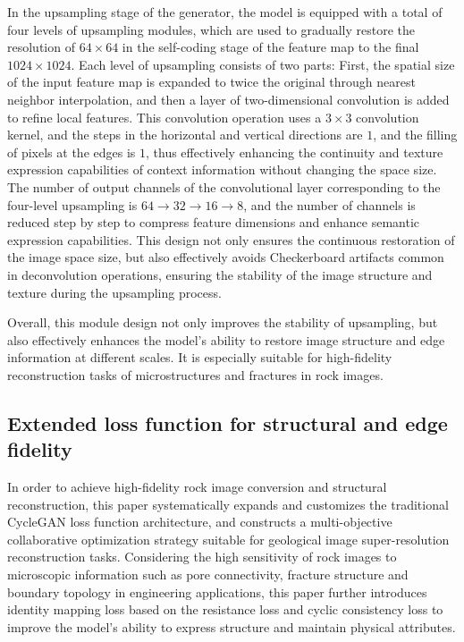 \documentclass[a4paper,fleqn]{cas-sc}
\begin{document}
In the upsampling stage of the generator, the model is equipped with a total of four levels of upsampling modules, which are used to gradually restore the resolution of $ 64\times  64$ in the self-coding stage of the feature map to the final $1024 \times 1024$. Each level of upsampling consists of two parts:
First, the spatial size of the input feature map is expanded to twice the original through nearest neighbor interpolation, and then a layer of two-dimensional convolution is added to refine local features. This convolution operation uses a $3 \times 3$ convolution kernel, and the steps in the horizontal and vertical directions are $1$, and the filling of pixels at the edges is $1$, thus effectively enhancing the continuity and texture expression capabilities of context information without changing the space size.
The number of output channels of the convolutional layer corresponding to the four-level upsampling is $64→32→16→8$, and the number of channels is reduced step by step to compress feature dimensions and enhance semantic expression capabilities. This design not only ensures the continuous restoration of the image space size, but also effectively avoids Checkerboard artifacts common in deconvolution operations, ensuring the stability of the image structure and texture during the upsampling process. 

Overall, this module design not only improves the stability of upsampling, but also effectively enhances the model's ability to restore image structure and edge information at different scales. It is especially suitable for high-fidelity reconstruction tasks of microstructures and fractures in rock images. 





\subsection{Extended loss function for structural and edge fidelity}

In order to achieve high-fidelity rock image conversion and structural reconstruction, this paper systematically expands and customizes the traditional CycleGAN loss function architecture, and constructs a multi-objective collaborative optimization strategy suitable for geological image super-resolution reconstruction tasks. Considering the high sensitivity of rock images to microscopic information such as pore connectivity, fracture structure and boundary topology in engineering applications, this paper further introduces identity mapping loss based on the resistance loss and cyclic consistency loss to improve the model's ability to express structure and maintain physical attributes.
\end{document}
